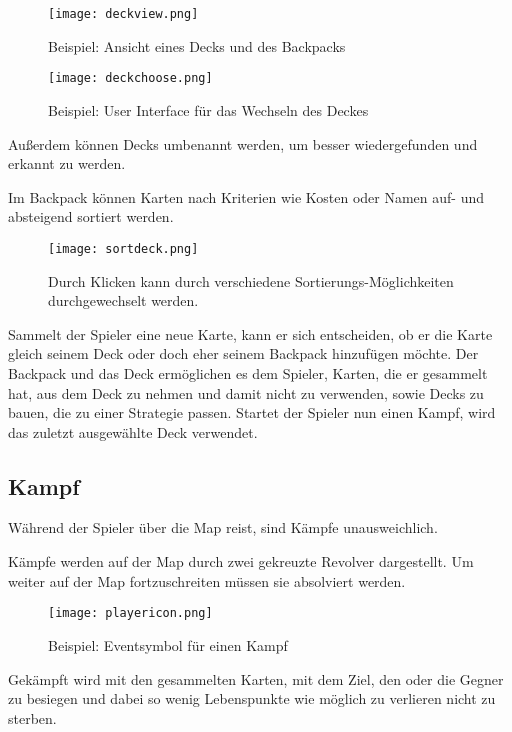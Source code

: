 \begin{figure}[H]
    \texttt{[image: deckview.png]}
    \caption{Beispiel: Ansicht eines Decks und des Backpacks}
\end{figure}

\begin{figure}[H]
    \texttt{[image: deckchoose.png]}
    \caption{Beispiel: User Interface für das Wechseln des Deckes}
\end{figure}


Außerdem können Decks umbenannt werden, um besser wiedergefunden und erkannt zu werden.

Im Backpack können Karten nach Kriterien wie Kosten oder Namen auf- und absteigend sortiert werden.

\begin{figure}[H]
    \texttt{[image: sortdeck.png]}
    \caption{Durch Klicken kann durch verschiedene Sortierungs-Möglichkeiten durchgewechselt werden.}
\end{figure}

Sammelt der Spieler eine neue Karte, kann er sich entscheiden, ob er die Karte gleich seinem Deck oder doch eher seinem
Backpack hinzufügen möchte.
Der Backpack und das Deck ermöglichen es dem Spieler, Karten, die er gesammelt hat, aus dem Deck zu nehmen und damit
nicht zu verwenden, sowie Decks zu bauen, die zu einer Strategie passen.
Startet der Spieler nun einen Kampf, wird das zuletzt ausgewählte Deck verwendet.


\subsection{Kampf}\label{backpack_and_deck}

Während der Spieler über die Map reist, sind Kämpfe unausweichlich.


Kämpfe werden auf der Map durch zwei gekreuzte Revolver dargestellt. Um weiter auf der Map fortzuschreiten müssen sie absolviert werden.

\begin{figure}[H]
    \texttt{[image: playericon.png]}
    \caption{Beispiel: Eventsymbol für einen Kampf}
\end{figure}

Gekämpft wird mit den gesammelten Karten, mit dem Ziel, den oder die Gegner zu besiegen und dabei so wenig Lebenspunkte
wie möglich zu verlieren \bzw nicht zu sterben.

